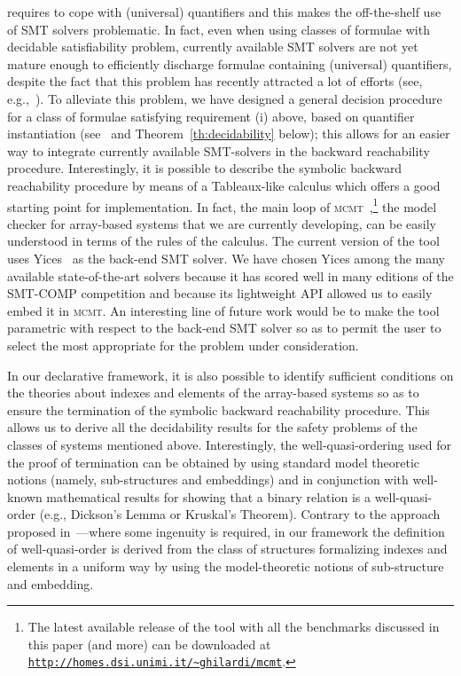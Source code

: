 \documentclass{LMCS}
\theoremstyle{plain}\newtheorem{assumption}[thm]{Assumption}
\theoremstyle{plain}\newtheorem{proposition}[thm]{Proposition}
\theoremstyle{plain}\newtheorem{property}[thm]{Property}
\theoremstyle{plain}\newtheorem{example}[thm]{Example}
\theoremstyle{plain}\newtheorem{claim}[thm]{Claim}
\theoremstyle{plain}\newtheorem{lemma}[thm]{Lemma}
\begin{document}
requires to cope with (universal) quantifiers and this makes the
off-the-shelf use of SMT solvers problematic.  In fact, even when
using classes of formulae with decidable satisfiability problem,
currently available SMT solvers are not yet mature enough to
efficiently discharge formulae containing (universal) quantifiers,
despite the fact that this problem has recently attracted a lot of
efforts (see,
e.g.,~\cite{miopapersttt,barret-tinelli,demoura-bijoerner}).  To
alleviate this problem, we have designed a general decision procedure
for a class of formulae satisfying requirement (i) above, based on
quantifier instantiation (see~\cite{ijcar08} and
Theorem~\ref{th:decidability} below); this allows for an easier way to
integrate currently available SMT-solvers in the backward reachability
procedure.  Interestingly, it is possible to describe the symbolic backward
reachability procedure by means of a Tableaux-like calculus which
offers a good starting point for implementation.  In fact, the main
loop of \textsc{mcmt}~\cite{ijcar10},\footnote{The latest available
  release of the tool with all the benchmarks discussed in this paper
  (and more) can be downloaded at
  \texttt{\url{http://homes.dsi.unimi.it/~ghilardi/mcmt}}. } the model
checker for array-based systems that we are currently developing, can
be easily understood in terms of the rules of the calculus.
The current version of the tool uses Yices~\cite{Dutertre06theyices}
as the back-end SMT solver.  We have chosen Yices among the many
available state-of-the-art solvers because it has scored well in many
editions of the SMT-COMP competition and because its lightweight API
allowed us to easily embed it in \textsc{mcmt}.  An interesting line of
future work would be to make the tool parametric with respect to the
back-end SMT solver so as to permit the user to select the most
appropriate for the problem under consideration.

In our declarative framework, it is also possible to identify
sufficient conditions on the theories about indexes and elements of
the array-based systems so as to ensure the termination of the
symbolic backward reachability procedure.  This allows us to derive
all the decidability results for the safety problems of the classes of
systems mentioned above.  Interestingly, the well-quasi-ordering used
for the proof of termination can be obtained by using standard model
theoretic notions (namely, sub-structures and embeddings) and in
conjunction with well-known mathematical results for showing that a
binary relation is a well-quasi-order (e.g., Dickson's Lemma or
Kruskal's Theorem).
Contrary to the approach proposed in~\cite{lics}---where some ingenuity
is required, in our framework the definition of well-quasi-order is
derived from the class of structures formalizing indexes and elements
in a uniform way by using the model-theoretic notions of sub-structure
and embedding.
\end{document}

